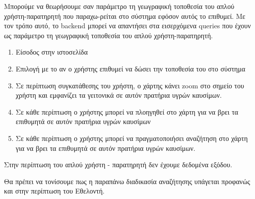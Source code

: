 Μπορούμε να θεωρήσουμε σαν παράμετρο τη γεωγραφική τοποθεσία του απλού χρήστη-παρατηρητή που παραχω-ρείται στο σύστημα εφόσον αυτός το επιθυμεί. Με τον τρόπο αυτό, το backend μπορεί να απαντήσει στα εισερχόμενα queries που έχουν ως παράμετρο τη γεωγραφική τοποθεσία του απλού χρήστη-παρατηρητή.
\begin{enumerate}
	\item Είσοδος στην ιστοσελίδα
	\item Επιλογή με το αν ο χρήστης επιθυμεί να δώσει την τοποθεσία του στο σύστημα
	\item Σε περίπτωση συγκατάθεσης του χρήστη, ο χάρτης κάνει zoom στο σημείο του χρήστη και εμφανίζει τα γειτονικά σε αυτόν πρατήρια υγρών καυσίμων.
	\item Σε κάθε περίπτωση ο χρήστης μπορεί να πλοηγηθεί στο χάρτη για να βρει τα επιθυμητά σε αυτόν πρατήρια υγρών καυσίμων
	\item Σε κάθε περίπτωση ο χρήστης μπορεί να πραγματοποιήσει αναζήτηση στο χάρτη για να βρει τα επιθυμητά σε αυτόν πρατήρια υγρών καυσίμων.
\end{enumerate}

Στην περίπτωση του απλού χρήστη - παρατηρητή δεν έχουμε δεδομένα εξόδου.

Θα πρέπει να τονίσουμε πως η παραπάνω διαδικασία αναζήτησης υπάγεται προφανώς και στην περίπτωση του Εθελοντή.

